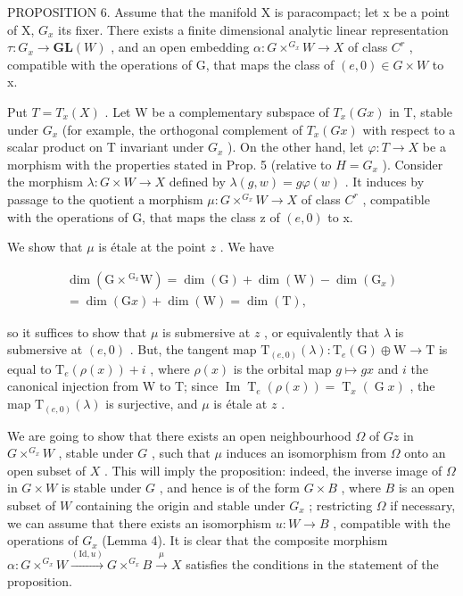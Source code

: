 PROPOSITION 6. Assume that the manifold X is paracompact; let x be a point of X, \(G_{x}\) its fixer. There exists a finite dimensional analytic linear representation \(\tau: G_{x} \to \mathbf{GL}(W)\) , and an open embedding \(\alpha: G \times ^{G_{x}} W \to X\) of class \(C^{r}\) , compatible with the operations of G, that maps the class of \((e,0) \in G \times W\) to x.

Put \(T = T_{x}(X)\) . Let W be a complementary subspace of \(T_{x}(Gx)\) in T, stable under \(G_{x}\) (for example, the orthogonal complement of \(T_{x}(Gx)\) with respect to a scalar product on T invariant under \(G_{x}\) ). On the other hand, let \(\varphi : T \to X\) be a morphism with the properties stated in Prop. 5 (relative to \(H = G_{x}\) ). Consider the morphism \(\lambda : G \times W \to X\) defined by \(\lambda(g, w) = g\varphi(w)\) . It induces by passage to the quotient a morphism \(\mu : G \times^{G_{x}}W \to X\) of class \(C^{r}\) , compatible with the operations of G, that maps the class z of \((e, 0)\) to x.

We show that \(\mu\) is étale at the point \(z\) . We have

\[
\begin{array}{c} \dim (\mathrm{G} \times {} ^ {\mathrm{G} _ {x}} \mathrm{W}) = \dim (\mathrm{G}) + \dim (\mathrm{W}) - \dim (\mathrm{G} _ {x}) \\ = \dim (\mathrm{G} x) + \dim (\mathrm{W}) = \dim (\mathrm{T}), \end{array}
\]

so it suffices to show that \(\mu\) is submersive at \(z\) , or equivalently that \(\lambda\) is submersive at \((e,0)\) . But, the tangent map \(\mathrm{T}_{(e,0)}(\lambda):\mathrm{T}_e(\mathrm{G})\oplus \mathrm{W}\to \mathrm{T}\) is equal to \(\mathrm{T}_e(\rho (x)) + i\) , where \(\rho (x)\) is the orbital map \(g\mapsto gx\) and \(i\) the canonical injection from W to T; since \(\operatorname {Im}\operatorname {T}_e(\rho (x)) = \operatorname {T}_x(\operatorname {G}x)\) , the map \(\mathrm{T}_{(e,0)}(\lambda)\) is surjective, and \(\mu\) is étale at \(z\) .

We are going to show that there exists an open neighbourhood \(\Omega\) of \(Gz\) in \(G \times ^{G_x}W\) , stable under \(G\) , such that \(\mu\) induces an isomorphism from \(\Omega\) onto an open subset of \(X\) . This will imply the proposition: indeed, the inverse image of \(\Omega\) in \(G \times W\) is stable under \(G\) , and hence is of the form \(G \times B\) , where \(B\) is an open subset of \(W\) containing the origin and stable under \(G_x\) ; restricting \(\Omega\) if necessary, we can assume that there exists an isomorphism \(u: W \to B\) , compatible with the operations of \(G_x\) (Lemma 4). It is clear that the composite morphism \(\alpha: G \times ^{G_x}W \xrightarrow{(\text{Id}, u)} G \times ^{G_x}B \xrightarrow{\mu} X\) satisfies the conditions in the statement of the proposition.

